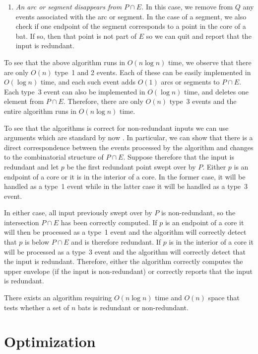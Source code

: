 \documentclass[lotsofwhite]{patmorin}
\begin{document}
{\begin{enumerate}
\item \emph{An arc or segment disappears from $P\cap E$.}  In this
case, we remove from $Q$ any events associated with the arc or
segment.  In the case of a segment, we also check if one endpoint of
the segment corresponds to a point in the core of a bat.  If so, then
that point is not part of $E$ so we can quit and report that the input
is redundant.
\end{enumerate}

To see that the above algorithm runs in $O(n\log n)$ time, we observe
that there are only $O(n)$ type~1 and 2 events.  Each of these can be
easily implemented in $O(\log n)$ time, and each such event adds
$O(1)$ arcs or segments to $P\cap E$.  Each type~3 event can also be
implemented in $O(\log n)$ time, and deletes one element from $P\cap
E$.  Therefore, there are only $O(n)$ type~3 events and the entire
algorithm runs in $O(n\log n)$ time.

To see that the algorithms is correct for non-redundant inputs we can
use arguments which are standard by now \cite{f87}.  In particular, we
can show that there is a direct correspondence between the events
processed by the algorithm and changes to the combinatorial structure
of $P\cap E$.  Suppose therefore that the input is redundant and let
$p$ be the first redundant point swept over by $P$.  Either $p$ is an
endpoint of a core or it is in the interior of a core.  In the former
case, it will be handled as a type~1 event while in the latter case it
will be handled as a type~3 event.

In either case, all input previously swept over by $P$ is
non-redundant, so the intersection $P\cap E$ has been correctly
computed.  If $p$ is an endpoint of a core it will then be processed
as a type~1 event and the algorithm will correctly detect that $p$ is
below $P\cap E$ and is therefore redundant.  If $p$ is in the interior
of a core it will be processed as a type~3 event and the algorithm
will correctly detect that the input is redundant.  Therefore, either
the algorithm correctly computes the upper envelope (if the input is
non-redundant) or correctly reports that the input is redundant.
}


\begin{lem}
There exists an algorithm requiring $O(n\log n)$ time and $O(n)$ space
that tests whether a set of $n$ bats is redundant or non-redundant.
\end{lem}

\section{Optimization}
\end{document}
